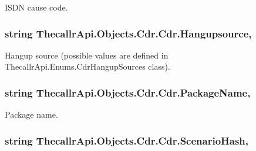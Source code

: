 I\+S\+D\+N cause code. 

\hypertarget{class_thecallr_api_1_1_objects_1_1_cdr_1_1_cdr_a2d51198b5beb2aa54dea66ef3f79c9b6}{
\subsubsection[{Hangupsource}]{\setlength{\rightskip}{0pt plus 5cm}string Thecallr\+Api.\+Objects.\+Cdr.\+Cdr.\+Hangupsource\hspace{0.3cm}{\ttfamily [get]}, {\ttfamily [set]}}}\label{class_thecallr_api_1_1_objects_1_1_cdr_1_1_cdr_a2d51198b5beb2aa54dea66ef3f79c9b6}


Hangup source (possible values are defined in Thecallr\+Api.\+Enums.\+Cdr\+Hangup\+Sources class). 

\hypertarget{class_thecallr_api_1_1_objects_1_1_cdr_1_1_cdr_aaf35fd3a4fd477b805ac88c16a00273d}{
\subsubsection[{Package\+Name}]{\setlength{\rightskip}{0pt plus 5cm}string Thecallr\+Api.\+Objects.\+Cdr.\+Cdr.\+Package\+Name\hspace{0.3cm}{\ttfamily [get]}, {\ttfamily [set]}}}\label{class_thecallr_api_1_1_objects_1_1_cdr_1_1_cdr_aaf35fd3a4fd477b805ac88c16a00273d}


Package name. 

\hypertarget{class_thecallr_api_1_1_objects_1_1_cdr_1_1_cdr_a31530558154022c2b05e71e521b8ff13}{
\subsubsection[{Scenario\+Hash}]{\setlength{\rightskip}{0pt plus 5cm}string Thecallr\+Api.\+Objects.\+Cdr.\+Cdr.\+Scenario\+Hash\hspace{0.3cm}{\ttfamily [get]}, {\ttfamily [set]}}}\label{class_thecallr_api_1_1_objects_1_1_cdr_1_1_cdr_a31530558154022c2b05e71e521b8ff13}


